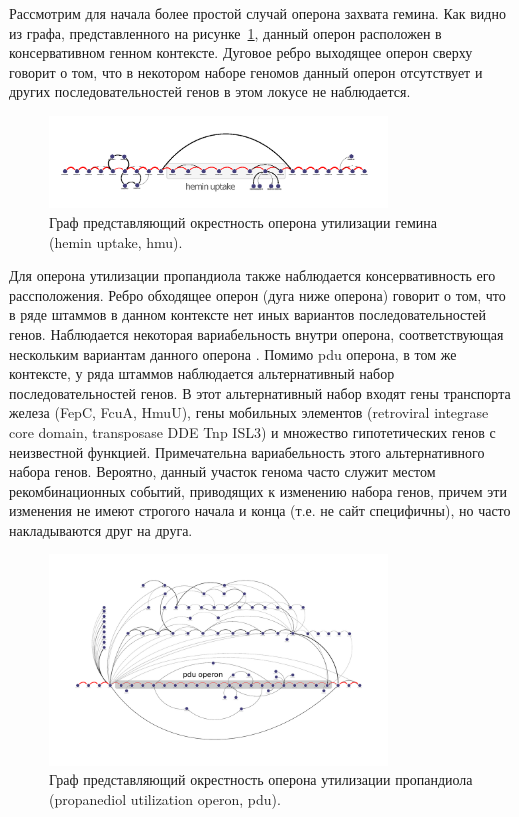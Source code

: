 Рассмотрим для начала более простой случай оперона захвата гемина. Как видно из графа, представленного на рисунке~\ref{img:sub_hem}, данный оперон расположен в консервативном генном контексте. Дуговое ребро выходящее оперон сверху говорит о том, что в некотором наборе геномов данный оперон отсутствует и других последовательностей генов в этом локусе не наблюдается. 

\begin{figure}[!ht] 
  \center
  \includegraphics[width=0.8\textwidth]{Dissertation/images/subgraphs/hemin.png}
  \caption{Граф представляющий окрестность оперона утилизации гемина (hemin uptake, hmu).}
  \label{img:sub_hem} 
\end{figure}

Для оперона утилизации пропандиола также наблюдается консервативность его рассположения. Ребро обходящее оперон (дуга ниже оперона) говорит о том, что в ряде штаммов в данном контексте нет иных вариантов последовательностей генов. Наблюдается некоторая вариабельность внутри оперона, соответствующая нескольким вариантам данного оперона \cite{rakitina2017genome}. Помимо pdu оперона, в том же контексте, у ряда штаммов наблюдается альтернативный набор последовательностей генов. В этот альтернативный набор входят гены транспорта железа (FepC, FcuA, HmuU), гены мобильных элементов (retroviral integrase core domain, transposase DDE Tnp ISL3) и множество гипотетических генов с неизвестной функцией. Примечательна вариабельность этого альтернативного набора генов. Вероятно, данный участок генома часто служит местом рекомбинационных событий, приводящих к изменению набора генов, причем эти изменения не имеют строгого начала и конца (т.е. не сайт специфичны), но часто накладываются друг на друга. 

\begin{figure}[!ht] 
  \center
    \includegraphics[width=0.8\textwidth]{Dissertation/images/subgraphs/pdutail1minw2_v2.pdf}
  \caption{Граф представляющий окрестность оперона утилизации пропандиола (propanediol utilization operon, pdu). }
  \label{img:sub_pdu} 
\end{figure}

